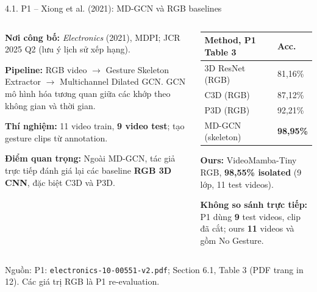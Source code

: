 \documentclass[aspectratio=169,9pt]{beamer}
\newcommand{\smallnote}[1]{{\fontsize{7.1}{8.4}\selectfont #1\par}}
\newcommand{\srcn}[1]{{\fontsize{7.0}{8.2}\selectfont\color{Muted}Nguồn: #1}}
\begin{document}
\begin{frame}{4.1. P1 -- Xiong et al. (2021): MD-GCN và RGB baselines}
\begin{columns}[T,onlytextwidth]
\begin{column}{0.48\textwidth}
\begin{tcolorbox}[titlepanel,title=Phương pháp và bài toán,height=5.00cm]
\smallnote{\textbf{Nơi công bố:} \emph{Electronics} (2021), MDPI; JCR 2025 Q2 (lưu ý lịch sử xếp hạng).}\par\vspace{0.14cm}
\smallnote{\textbf{Pipeline:} RGB video $\rightarrow$ Gesture Skeleton Extractor $\rightarrow$ Multichannel Dilated GCN. GCN mô hình hóa tương quan giữa các khớp theo không gian và thời gian.}\par\vspace{0.14cm}
\smallnote{\textbf{Thí nghiệm:} 11 video train, \textbf{9 video test}; tạo gesture clips từ annotation.}\par\vspace{0.14cm}
\smallnote{\textbf{Điểm quan trọng:} Ngoài MD-GCN, tác giả trực tiếp đánh giá lại các baseline \textbf{RGB 3D CNN}, đặc biệt C3D và P3D.}
\end{tcolorbox}
\end{column}
\begin{column}{0.50\textwidth}
\begin{tcolorbox}[titlepanel,title=Kết quả và đối chiếu,height=5.00cm]
\renewcommand{\arraystretch}{1.16}
\begin{tabularx}{\linewidth}{@{}Y C{1.42cm}@{}}
\toprule
\textbf{Method, P1 Table 3} & \textbf{Acc.}\\\midrule
3D ResNet (RGB) & 81,16\%\\
C3D (RGB) & 87,12\%\\
P3D (RGB) & 92,21\%\\
MD-GCN (skeleton) & \textbf{98,95\%}\\\bottomrule
\end{tabularx}
\vspace{0.16cm}
\smallnote{\textbf{Ours:} VideoMamba-Tiny RGB, \textbf{98,55\% isolated} (9 lớp, 11 test videos).}\par\vspace{0.11cm}
\smallnote{\textbf{Không so sánh trực tiếp:} P1 dùng \textbf{9} test videos, clip đã cắt; ours \textbf{11} videos và gồm No Gesture.}
\end{tcolorbox}
\end{column}
\end{columns}
\vspace{0.06cm}
\srcn{P1: \texttt{electronics-10-00551-v2.pdf}; Section 6.1, Table 3 (PDF trang in 12). Các giá trị RGB là P1 re-evaluation.}
\end{frame}
\end{document}
